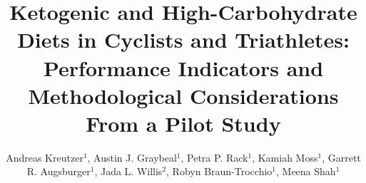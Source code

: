 \documentclass[]{cik}%
\begin{document}
\title{Ketogenic and High-Carbohydrate Diets in Cyclists and
Triathletes: Performance Indicators and Methodological Considerations
From a Pilot Study}

\author{
Andreas Kreutzer$^{1}$,
Austin J. Graybeal$^{1}$,
Petra P. Rack$^{1}$,
Kamiah Moss$^{1}$,
Garrett R. Augsburger$^{1}$,
Jada L. Willis$^{2}$,
Robyn Braun-Trocchio$^{1}$,
Meena Shah$^{1}$}

\address{
  $^{1}$Department of Kinesiology, Harris College of Nursing \& Health
Sciences, Texas Christian University, Fort Worth, TX\\
  $^{2}$Department of Nutritional Sciences, College of Science \&
Engineering, Texas Christian University, Fort Worth, TX}
\subject{
Physiology \& Nutrition}





\end{document}
